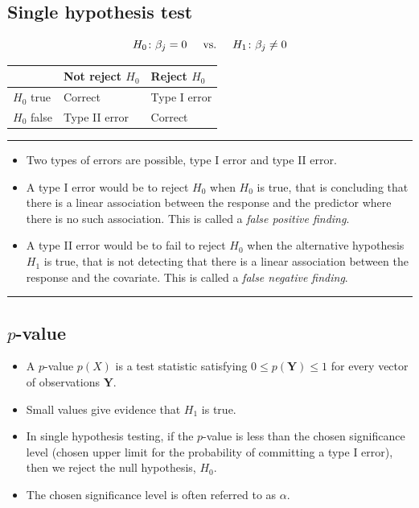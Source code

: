 \documentclass[
  letterpaper,
  DIV=11,
  numbers=noendperiod]{scrartcl}
\providecommand{\tightlist}{%
  \setlength{\itemsep}{0pt}\setlength{\parskip}{0pt}}\usepackage{longtable,booktabs,array}
\begin{document}
\hypertarget{single-hypothesis-test}{%
\subsection{Single hypothesis test}\label{single-hypothesis-test}}

\[H_{0}\colon \beta_j=0 \hspace{0.5cm} \text{vs.} \hspace{0.5cm} H_{1}\colon \beta_j \neq 0\]

\begin{longtable}[]{@{}lll@{}}
\toprule()
& Not reject \(H_0\) & Reject \(H_0\) \\
\midrule()
\endhead
\(H_0\) true & Correct & Type I error \\
\(H_0\) false & Type II error & Correct \\
\bottomrule()
\end{longtable}

\begin{center}\rule{0.5\linewidth}{0.5pt}\end{center}

\begin{itemize}
\tightlist
\item
  Two types of errors are possible, type I error and type II error.
\item
  A type I error would be to reject \(H_0\) when \(H_0\) is true, that
  is concluding that there is a linear association between the response
  and the predictor where there is no such association. This is called a
  \emph{false positive finding}.
\item
  A type II error would be to fail to reject \(H_0\) when the
  alternative hypothesis \(H_1\) is true, that is not detecting that
  there is a linear association between the response and the covariate.
  This is called a \emph{false negative finding}.
\end{itemize}

\begin{center}\rule{0.5\linewidth}{0.5pt}\end{center}

\hypertarget{p-value}{%
\subsection{\texorpdfstring{\(p\)-value}{p-value}}\label{p-value}}

\begin{itemize}
\tightlist
\item
  A \(p\)-value \(p(X)\) is a test statistic satisfying
  \(0 \leq p({\boldsymbol Y}) \leq 1\) for every vector of observations
  \(\boldsymbol{Y}\).
\item
  Small values give evidence that \(H_1\) is true.
\item
  In single hypothesis testing, if the \(p\)-value is less than the
  chosen significance level (chosen upper limit for the probability of
  committing a type I error), then we reject the null hypothesis,
  \(H_0\).
\item
  The chosen significance level is often referred to as \(\alpha\).
\end{itemize}
\end{document}
